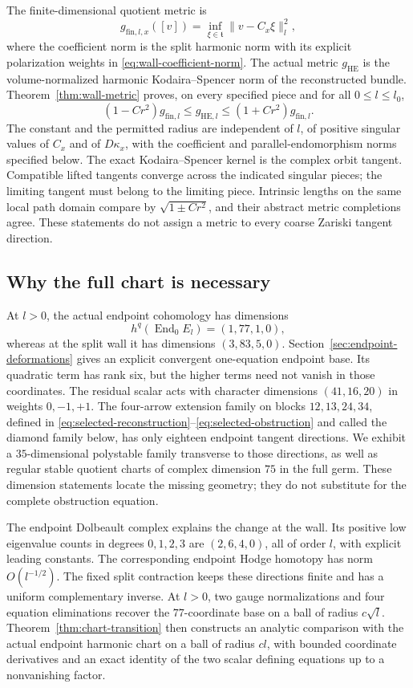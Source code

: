 \documentclass[11pt]{amsart}
\theoremstyle{definition}
\theoremstyle{remark}
\newcommand{\End}{\operatorname{End}}
\begin{document}
The finite-dimensional quotient metric is
\[
 g_{\mathrm{fin},l,x}([v])=\inf_{\xi\in\mathfrak t}\|v-C_x\xi\|_l^2,
\]
where the coefficient norm is the split harmonic norm with its explicit
polarization weights in \eqref{eq:wall-coefficient-norm}. The actual
metric $g_{\mathrm{HE}}$ is the volume-normalized harmonic
Kodaira--Spencer norm of the reconstructed bundle. Theorem~\ref{thm:wall-metric}
proves, on every specified piece and for all $0\le l\le l_0$,
\begin{equation}\label{eq:intro-relative}
 (1-Cr^2)g_{\mathrm{fin},l}\le g_{\mathrm{HE},l}
                         \le(1+Cr^2)g_{\mathrm{fin},l}.
\end{equation}
The constant and the permitted radius are independent of $l$, of
positive singular values of $C_x$ and of $D\kappa_x$, with the
coefficient and parallel-endomorphism norms specified below.
The exact Kodaira--Spencer kernel is the complex orbit tangent.
Compatible lifted tangents converge across the indicated singular pieces;
the limiting tangent must belong to the limiting piece. Intrinsic
lengths on the same local path domain compare by $\sqrt{1\pm Cr^2}$,
and their abstract metric completions agree. These statements do not
assign a metric to every coarse Zariski tangent direction.

\subsection{Why the full chart is necessary}
At $l>0$, the actual endpoint cohomology has dimensions
\[
 h^q(\End_0E_l)=(1,77,1,0),
\]
whereas at the split wall it has dimensions $(3,83,5,0)$.
Section~\ref{sec:endpoint-deformations} gives an explicit convergent
one-equation endpoint base. Its quadratic term has rank six, but the
higher terms need not vanish in those coordinates. The residual scalar
acts with character dimensions $(41,16,20)$ in weights $0,-1,+1$.
The four-arrow extension family on blocks $12,13,24,34$, defined in
\eqref{eq:selected-reconstruction}--\eqref{eq:selected-obstruction}
and called the diamond family below, has only
eighteen endpoint tangent directions. We exhibit a $35$-dimensional polystable family transverse
to those directions, as well as regular stable quotient charts of
complex dimension $75$ in the full germ. These dimension statements
locate the missing geometry; they do not substitute for the complete
obstruction equation.

The endpoint Dolbeault complex explains the change at the wall.
Its positive low eigenvalue counts in degrees $0,1,2,3$ are
$(2,6,4,0)$, all of order $l$, with explicit leading constants.
The corresponding endpoint Hodge homotopy has norm $O(l^{-1/2})$.
The fixed split contraction keeps these directions finite and has a
uniform complementary inverse. At $l>0$, two gauge normalizations
and four equation eliminations recover the $77$-coordinate base on
a ball of radius $c\sqrt l$. Theorem~\ref{thm:chart-transition} then constructs
an analytic comparison with the actual endpoint harmonic chart on a
ball of radius $cl$, with bounded coordinate derivatives and an exact identity
of the two scalar defining equations up to a nonvanishing factor.
\end{document}
